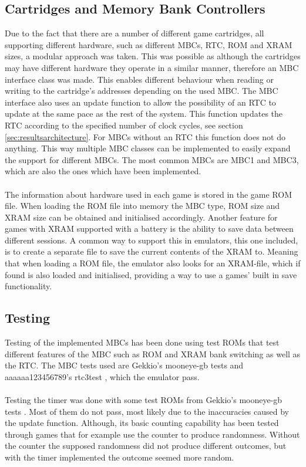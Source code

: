 

\subsection{Cartridges and Memory Bank Controllers}
Due to the fact that there are a number of different game cartridges, all supporting different hardware, such as different MBCs, RTC, ROM and XRAM sizes, a modular approach was taken. 
This was possible as although the cartridges may have different hardware they operate in a similar manner, therefore an MBC interface class was made.
This enables different behaviour when reading or writing to the cartridge's addresses depending on the used MBC. The MBC interface also uses an update function to allow the possibility of an RTC to update at the same pace as the rest of the system. This function updates the RTC according to the specified number of clock cycles, see section \ref{sec:resultsarchitecture}. For MBCs without an RTC this function does not do anything. This way multiple MBC classes can be implemented to easily expand the support for different MBCs. The most common MBCs are MBC1 and MBC3, which are also the ones which have been implemented.
\\\\
The information about hardware used in each game is stored in the game ROM file.
When loading the ROM file into memory the MBC type, ROM size and XRAM size can be obtained and initialised accordingly. 
Another feature for games with XRAM supported with a battery is the ability to save data between different sessions.
A common way to support this in emulators, this one included, is to create a separate file to save the current contents of the XRAM to. Meaning that when loading a ROM file, the emulator also looks for an XRAM-file, which if found is also loaded and initialised, providing a way to use a games' built in save functionality.

\subsection{Testing}
Testing of the implemented MBCs has been done using test ROMs that test different features of the MBC such as ROM and XRAM bank switching as well as the RTC. The MBC tests used are Gekkio's mooneye-gb tests \cite{Gekkio-Mooneye} and aaaaaa123456789's rtc3test \cite{mbc3test}, which the emulator pass.
\\\\
Testing the timer was done with some test ROMs from Gekkio's mooneye-gb tests \cite{Gekkio-Mooneye}. Most of them do not pass, most likely due to the inaccuracies caused by the update function. Although, its basic counting capability has been tested through games that for example use the counter to produce randomness. Without the counter the supposed randomness did not produce different outcomes, but with the timer implemented the outcome seemed more random.

